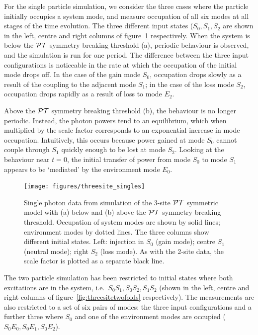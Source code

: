 For the single particle simulation, we consider the three cases where the
particle initially occupies a system mode, and measure occupation of all six
modes at all stages of the time evolution. The three different input states
(\(S_{0}, S_{1}, S_{2}\) are shown in the left, centre and right columns of
figure~\ref{fig:threesitesingles} respectively. When the system is below the
\(\mathcal{PT}\) symmetry breaking threshold (a), periodic behaviour is observed, and the
simulation is run for one period. The difference between the three input
configurations is noticeable in the rate at which the occupation of the initial
mode drops off. In the case of the gain mode \(S_{0}\), occupation drops slowly
as a result of the coupling to the adjacent mode \(S_{1}\); in the case of the
loss mode \(S_{2}\), occupation drops rapidly as a result of loss to mode
\(E_{2}\).

Above the \(\mathcal{PT}\) symmetry breaking threshold (b), the behaviour is no longer
periodic. Instead, the photon powers tend to an equilibrium, which when
multiplied by the scale factor corresponds to an exponential increase in mode
occupation. Intuitively, this occurs because power gained at mode \(S_{0}\)
cannot couple through \(S_{1}\) quickly enough to be lost at mode \(S_{2}\).
Looking at the behaviour near \(t=0\), the initial transfer of power from mode
\(S_{0}\) to mode \(S_{1}\) appears to be `mediated' by the environment mode
\(E_{0}\).

\begin{figure}[p]
  \centering
  \texttt{[image: figures/threesite\_singles]}
  \caption[Single photon data from simulation of the 3-site PT symmetric model]
  {Single photon data from simulation of the 3-site \(\mathcal{PT}\) symmetric model with
  (a) below and (b) above the \(\mathcal{PT}\) symmetry breaking threshold. Occupation of
  system modes are shown by solid lines; environment modes by dotted lines. The
  three columns show different initial states. Left: injection in \(S_{0}\)
  (gain mode); centre \(S_{1}\) (neutral mode); right \(S_{2}\) (loss mode). As
  with the 2-site data, the scale factor is plotted as a separate black line.}
  \label{fig:threesitesingles}
\end{figure}

The two particle simulation has been restricted to initial states where both
excitations are in the system, i.e.\ \(S_{0}S_{1}, S_{0}S_{2}, S_{1}S_{2}\)
(shown in the left, centre and right columns of
figure~\ref{fig:threesitetwofolds} respectively). The measurements are also
restricted to a set of six pairs of modes: the three input configurations and a
further three where \(S_{0}\) and one of the environment modes are occupied
(\(S_{0}E_{0}, S_{0}E_{1}, S_{0}E_{2}\)).

